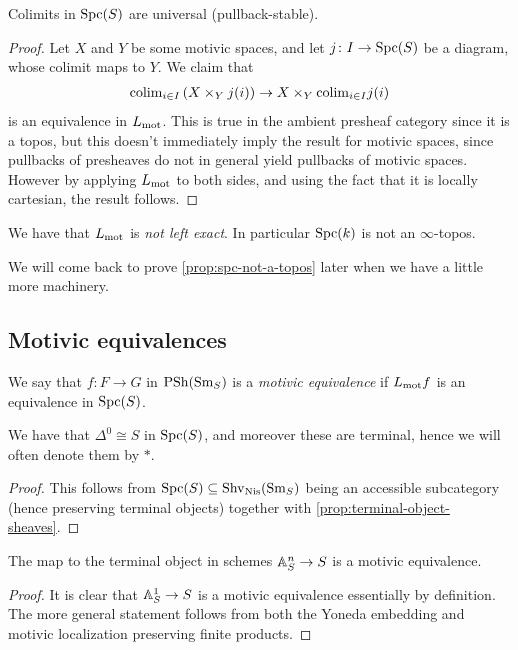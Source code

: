 \documentclass[11pt,openany]{book}
\begin{document}
\begin{corollary}\label{cor:universal-colimits-motivic-spaces}
Colimits in $\mathrm{Spc}(S)$ are universal (pullback-stable). 
\end{corollary}
\begin{proof} Let $X$ and $Y$ be some motivic spaces, and let $j \colon I \to \mathrm{Spc}(S)$ be a diagram, whose colimit maps to $Y$. We claim that
\begin{align*}
    \mathrm{colim}_{i\in I} \left( X \times_Y j(i) \right) \to X \times_Y \mathrm{colim}_{i\in I} j(i)
\end{align*}
is an equivalence in $L_{\mathrm{mot}}$. This is true in the ambient presheaf category since it is a topos, but this doesn't immediately imply the result for motivic spaces, since pullbacks of presheaves do not in general yield pullbacks of motivic spaces. However by applying $L_{\mathrm{mot}}$ to both sides, and using the fact that it is locally cartesian, the result follows.
\end{proof}


\begin{proposition}\label{prop:spc-not-a-topos} 
We have that $L_{\mathrm{mot}}$ is \textit{not left exact}. In particular $\mathrm{Spc}(k)$ is not an $\infty$-topos.
\end{proposition}
We will come back to prove \autoref{prop:spc-not-a-topos} later when we have a little more machinery.

\subsection{Motivic equivalences}


\begin{definition} We say that $f \colon F \to G$ in $\mathrm{PSh}(\mathrm{Sm}_S)$ is a \textit{motivic equivalence} if $L_{\mathrm{mot}} f$ is an equivalence in $\mathrm{Spc}(S)$.
\end{definition}

\begin{proposition}\label{prop:terminal-object-motivic-spaces} 
We have that $\Delta^0 \cong S$ in $\mathrm{Spc}(S)$, and moreover these are terminal, hence we will often denote them by $\ast$.
\end{proposition}
\begin{proof} This follows from $\mathrm{Spc}(S) \subseteq \mathrm{Shv}_{\mathrm{Nis}}(\mathrm{Sm}_S)$ being an accessible subcategory (hence preserving terminal objects) together with \autoref{prop:terminal-object-sheaves}.
\end{proof}

\begin{proposition} The map to the terminal object in schemes $\mathbb{A}^n_S \to S$ is a motivic equivalence.
\end{proposition}
\begin{proof} It is clear that $\mathbb{A}^1_S \to S$ is a motivic equivalence essentially by definition. The more general statement follows from both the Yoneda embedding and motivic localization preserving finite products.
\end{proof}
\end{document}
